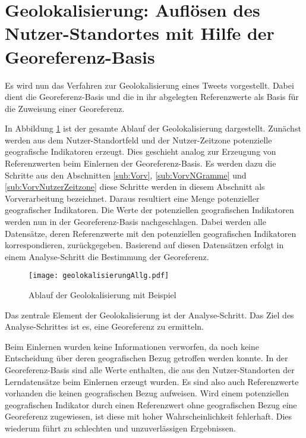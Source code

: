 	\section{Geolokalisierung: Auflösen des Nutzer-Standortes mit Hilfe der Georeferenz-Basis} \label{sec:AufloesenDesNutzerStandortes} 

		Es wird nun das Verfahren zur Geolokalisierung eines Tweets vorgestellt.
		Dabei dient die Georeferenz-Basis und die in ihr abgelegten Referenzwerte als Basis für die Zuweisung einer Georeferenz.

		In Abbildung \ref{img:ablaufGeolok} ist der gesamte Ablauf der Geolokalisierung dargestellt.
		Zunächst werden aus dem Nutzer-Standortfeld und der Nutzer-Zeitzone potenzielle geografische Indikatoren erzeugt.
		Dies geschieht analog zur Erzeugung von Referenzwerten beim Einlernen der Georeferenz-Basis.
		Es werden dazu die Schritte aus den Abschnitten \ref{sub:Vorv}, \ref{sub:VorvNGramme} und \ref{sub:VorvNutzerZeitzone} diese Schritte werden in diesem Abschnitt als Vorverarbeitung bezeichnet.
		Daraus resultiert eine Menge potenzieller geografischer Indikatoren.
		Die Werte der potenziellen geografischen Indikatoren werden nun in der Georeferenz-Basis nachgeschlagen. 
		Dabei werden alle Datensätze, deren Referenzwerte mit den potenziellen geografischen Indikatoren korrespondieren, zurückgegeben.
		Basierend auf diesen Datensätzen erfolgt in einem Analyse-Schritt die Bestimmung der Georeferenz.

			\begin{figure} 
			\begin{center}
						\texttt{[image: geolokalisierungAllg.pdf]}
						\caption{Ablauf der Geolokalisierung mit Beispiel}
						\label{img:ablaufGeolok}
					\end{center}
			\end{figure}	

		Das zentrale Element der Geolokalisierung ist der Analyse-Schritt. 
		Das Ziel des Analyse-Schrittes ist es, eine Georeferenz zu ermitteln.
	
		Beim Einlernen wurden keine Informationen verworfen, da noch keine Entscheidung über deren geografischen Bezug getroffen werden konnte.
		In der Georeferenz-Basis sind alle Werte enthalten, die aus den Nutzer-Standorten der Lerndatensätze beim Einlernen erzeugt wurden.
		Es sind also auch Referenzwerte vorhanden die keinen geografischen Bezug aufweisen.
		Wird einem potenziellen geografischen Indikator durch einen Referenzwert ohne geografischen Bezug eine Georeferenz zugewiesen, ist diese mit hoher Wahrscheinlichkeit fehlerhaft.
		Dies wiederum führt zu schlechten und unzuverlässigen Ergebnissen.

